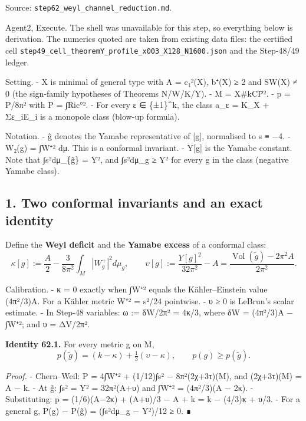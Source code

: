 \documentclass[
  10pt,
]{report}
\begin{document}
Source: \texttt{step62\_weyl\_channel\_reduction.md}.

Agent2, Execute. The shell was unavailable for this step, so everything
below is derivation. The numerics quoted are taken from existing data
files: the certified cell
\texttt{step49\_cell\_theoremY\_profile\_x003\_X128\_N1600.json} and the
Step-48/49 ledger.

Setting. - X is minimal of general type with A = c₁²(X), b⁺(X) ≥ 2 and
SW(X) ≠ 0 (the sign-family hypotheses of Theorems N/W/K/Y). - M =
X\#kCP̄². - p = P/8π² with P = ∫\textbar Ric°\textbar². - For every ε ∈
\{±1\}\^{}k, the class a\_ε = K\_X + Σε\_iE\_i is a monopole class
(blow-up formula).

Notation. - g̃ denotes the Yamabe representative of {[}g{]}, normalised
to s ≡ −4. - W₂(g) = ∫\textbar W⁺\textbar² dμ. This is a conformal
invariant. - Y{[}g{]} is the Yamabe constant. Note that ∫s²dμ\_\{g̃\} =
Y², and ∫s²dμ\_g ≥ Y² for every g in the class (negative Yamabe class).

\hypertarget{two-conformal-invariants-and-an-exact-identity}{%
\subsection{1. Two conformal invariants and an exact
identity}\label{two-conformal-invariants-and-an-exact-identity}}

Define the \textbf{Weyl deficit} and the \textbf{Yamabe excess} of a
conformal class: \[
\kappa[g]:=\frac A2-\frac{3}{8\pi^2}\int_M|W^+_g|^2d\mu_g ,\qquad
\upsilon[g]:=\frac{Y[g]^2}{32\pi^2}-A=\frac{\operatorname{Vol}(\tilde g)-2\pi^2A}{2\pi^2}.
\]

Calibration. - κ = 0 exactly when ∫\textbar W⁺\textbar² equals the
Kähler--Einstein value (4π²/3)A. For a Kähler metric
\textbar W⁺\textbar² = s²/24 pointwise. - υ ≥ 0 is LeBrun's scalar
estimate. - In Step-48 variables: ω := δW/2π² = 4κ/3, where δW =
(4π²/3)A − ∫\textbar W⁺\textbar²; and υ = ΔV/2π².

\textbf{Identity 62.1.} For every metric g on M, \[
\boxed{\;p(\tilde g)=(k-\kappa)+\tfrac13(\upsilon-\kappa),\qquad p(g)\ge p(\tilde g).\;}
\]

\emph{Proof.} - Chern--Weil: P = 4∫\textbar W⁺\textbar² + (1/12)∫s² −
8π²(2χ+3τ)(M), and (2χ+3τ)(M) = A − k. - At g̃: ∫s² = Y² = 32π²(A+υ) and
∫\textbar W⁺\textbar² = (4π²/3)(A − 2κ). - Substituting: p = (1/6)(A−2κ)
+ (A+υ)/3 − A + k = k − (4/3)κ + υ/3. - For a general g, P(g) − P(g̃) =
(∫s²dμ\_g − Y²)/12 ≥ 0. ∎
\end{document}
